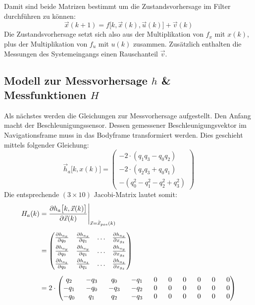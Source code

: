\documentclass[12pt,a4paper]{article}
\newcommand{\PA}[2]{\frac{\partial #1}{\partial #2}}
\begin{document}
		Damit sind beide Matrizen bestimmt um die Zustandsvorhersage im Filter durchführen zu können:
		\begin{equation}
			\vec{x}(k+1)=f\big[k,\vec{x}(k),\vec{u}(k)\big]+\vec{v}(k)
		\end{equation}
		Die Zustandsvorhersage setzt sich also aus der Multiplikation von $f_{x}$ mit $x(k)$, plus der Multiplikation von $f_{u}$ mit $u(k)$ zusammen. Zusätzlich enthalten die Messungen des Systemeingangs einen Rauschanteil $\vec{v}$.
		\subsection{Modell zur Messvorhersage $h$ \& Messfunktionen $H$}\label{subsec:ModellMessvorhersage}
		Als nächstes werden die Gleichungen zur Messvorhersage aufgestellt. Den Anfang macht der Beschleunigungssensor. Dessen gemessener Beschleunigungsvektor im Navigationsframe muss in das Bodyframe transformiert werden. Dies geschieht mittels folgender Gleichung:
		\begin{equation}\label{eq:MessvorhersageBeschleunigungssensor}
			\vec{h}_{a}\big[k,x(k)\big]=\begin{pmatrix}
			-2\cdot(q_{1}q_{3}-q_{0}q_{2})\\[0.4em]
			-2\cdot(q_{2}q_{3}+q_{0}q_{1})\\[0.4em]
			-(q_{0}^{2}-q_{1}^{2}-q_{2}^{2}+q_{3}^{2})
			\end{pmatrix}
		\end{equation}
		Die entsprechende $(3\times 10)$ Jacobi-Matrix lautet somit:
		\begin{equation}
			\begin{split}
				H_{a}(k)&=\frac{\partial h_{a}\big[k,\vec{x}(k)\big]}{\partial \vec{x}(k)}\Bigg \vert_{\vec{x}=\hat{\vec{x}}_{pos}(k)}\\[0.5em]
				&=\begin{pmatrix}
				\PA{h_{a_{x}}}{q_{0}} & \PA{h_{a_{x}}}{q_{1}} & \ldots & \PA{h_{a_{x}}}{x_{g_{z}}} \\[0.5em]
				\PA{h_{a_{y}}}{q_{0}} & \PA{h_{a_{y}}}{q_{1}} & \ldots & \PA{h_{a_{y}}}{x_{g_{z}}} \\[0.5em]
				\PA{h_{a_{z}}}{q_{0}} & \PA{h_{a_{z}}}{q_{1}} & \ldots & \PA{h_{a_{z}}}{x_{g_{z}}}
				\end{pmatrix}\\[0.5em]
				&=2\cdot
				\setlength{\arraycolsep}{8pt}
				\begin{pmatrix}
				q_{2} & -q_{3} & q_{0} & -q_{1} & 0 & 0 & 0 & 0 & 0 & 0 \\
				-q_{1} & -q_{0} & -q_{3} & -q_{2} & 0 & 0 & 0 & 0 & 0 & 0 \\
				-q_{0} & q_{1} & q_{2} & -q_{3} & 0 & 0 & 0 & 0 & 0 & 0
				\end{pmatrix}
			\end{split}
		\end{equation}\\
\end{document}
